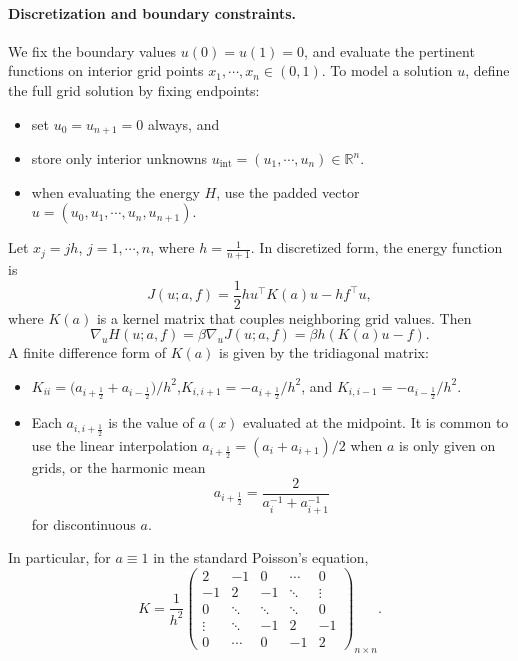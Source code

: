 \documentclass[11pt]{article}
\newcommand{\bbR}{\mathbb{R}}
\begin{document}
\paragraph{Discretization and boundary constraints.} We fix the boundary values $u(0)=u(1)=0$, and evaluate the pertinent functions on interior grid points $x_1,\cdots,x_n\in(0,1)$. To model a solution $u$, define the full grid solution by fixing endpoints:
\begin{itemize}[itemsep=-2pt]
    \item set $u_0=u_{n+1}=0$ always, and
    \item store only interior unknowns $u_{\text{int}}=(u_1,\cdots,u_n)\in\bbR^n$.
    \item when evaluating the energy $H$, use the padded vector $u=(u_0,u_1,\cdots,u_n,u_{n+1})$.
\end{itemize}
Let $x_j=jh$, $j=1,\cdots,n$, where $h=\frac{1}{n+1}$. In discretized form, the energy function is
\begin{equation*}
J(u;a,f)=\frac{1}{2}hu^\top K(a) u-hf^\top u,
\end{equation*}
where $K(a)$ is a kernel matrix that couples neighboring grid values. Then
\begin{equation*}
    \nabla_u H(u;a,f)=\beta\nabla_u J(u;a,f)=\beta h\left(K(a)u-f\right).
\end{equation*}
A finite difference form of $K(a)$ is given by the tridiagonal matrix:
\begin{itemize}[itemsep=-2pt]
    \item $K_{ii}=\bigl(a_{i+\frac{1}{2}}+a_{i-\frac{1}{2}}\bigr)/h^2$,\quad $K_{i,i+1}=-a_{i+\frac{1}{2}}/h^2$, and $K_{i,i-1}=-a_{i-\frac{1}{2}}/h^2$.
    \item Each $a_{i,i+\frac{1}{2}}$ is the value of $a(x)$ evaluated at the midpoint. It is common to use the linear interpolation $a_{i+\frac{1}{2}}=(a_i+a_{i+1})/2$ when $a$ is only given on grids, or the harmonic mean $$a_{i+\frac{1}{2}}=\frac{2}{a_i^{-1}+a_{i+1}^{-1}}$$
    for discontinuous $a$.
\end{itemize}
In particular, for $a\equiv 1$ in the standard Poisson's equation,
\begin{equation}
    K=\frac{1}{h^2}\begin{pmatrix}
        2 & -1 & 0 & \cdots & 0 \\
        -1 & 2 & -1 & \ddots & \vdots\\
        0 & \ddots & \ddots & \ddots & 0 \\
        \vdots & \ddots & -1 & 2 & -1\\
        0 & \cdots & 0 & -1 & 2
    \end{pmatrix}_{n\times n}.\label{eq:diffkernel}
\end{equation}
\end{document}

